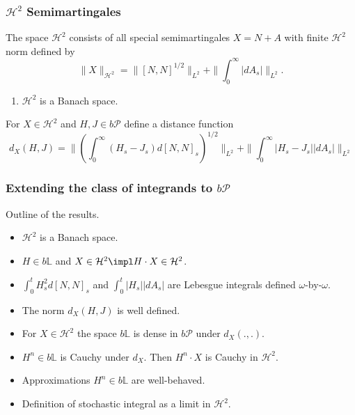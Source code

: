 \begin{frame}
    \frametitle{$\mathcal H^2$ Semimartingales}
    
    The space $\mathcal H^2$ consists of all special semimartingales $X=N+A$
    with finite $\mathcal H^2$ norm defined by
    \begin{equation}
        \| X \|_{\mathcal H^2} = \| \left[ N, N \right]^{1/2} \|_{L^2} 
            + \| \int_{0}^{\infty} |d A_s | \|_{L^2}.
    \end{equation}
    \begin{enumerate}
        \item $\mathcal H^2$ is a Banach space.
    \end{enumerate}

    For $X\in \mathcal H^2$ and $H,J \in b\mathcal P$ define a distance function
    \begin{equation*}
        d_X\left( H,J \right) = 
            \| \left( \int_{0}^{\infty} (H_s-J_s) d\left[ N,N \right]_s \right)^{1/2} \|_{L^2} +
            \| \int_{0}^{\infty} |H_s-J_s| |d A_s| \|_{L^2}
    \end{equation*}
\end{frame}


\begin{frame}
    \frametitle{Extending the class of integrands to $b\mathcal P$}

    Outline of the results. 
    \begin{itemize}
        \item $\mathcal H^2$ is a Banach space.
        \item $H\in b\mathbb L$ and $X\in \mathcal H^2 \impl H \cdot X \in \mathcal H^2$. 
        \item $\int_{0}^{t} H^2_s d \left[ N,N \right]_s$ and $\int_{0}^{t} |H_s| |dA_s|$ are
            Lebesgue integrals defined $\omega$-by-$\omega$.
        \item The norm $d_X(H,J)$ is well defined.
        \item For $X\in \mathcal H^2$ the space $b\mathbb L$ is dense in $b\mathcal P$ under $d_X\left( .,. \right)$.
        \item $H^n\in b\mathbb L$ is Cauchy under $d_X$. Then $H^n \cdot X$ is Cauchy in $\mathcal H^2$. 
        \item Approximations $H^n\in b\mathbb L$ are well-behaved.
        \item Definition of stochastic integral as a limit in $\mathcal H^2$. 
    \end{itemize}
\end{frame}


